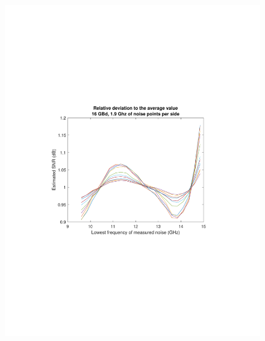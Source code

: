 \begin{refsection}
\begin{figure}[H]
	\centering
	\begin{minipage}{0.43\textwidth}
		\centering
		\includegraphics[clip, trim=4cm 8cm 4cm 8cm,
		width=1\textwidth]{./sdf/m_qam_system/figures/snr/relDev/16GBSNRRelDev.pdf}
		\subcaption{\label{fig:snrRelDev_16_500}}
	\end{minipage}
	\begin{minipage}{0.43\textwidth}
		\centering

\end{minipage}
\end{figure}
\end{refsection}
